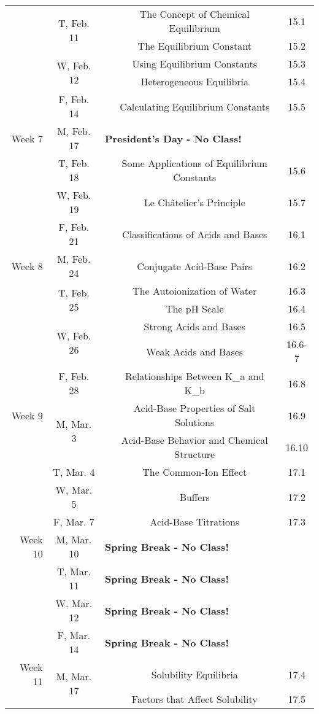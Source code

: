 \begin{tabular}{rcccc}
& \multirow{2}{*}{T, Feb. 11}& & The Concept of Chemical Equilibrium & 15.1\\
& & & The Equilibrium Constant & 15.2\\
& \multirow{2}{*}{W, Feb. 12}& & Using Equilibrium Constants & 15.3\\
& & & Heterogeneous Equilibria & 15.4\\
& F, Feb. 14&& Calculating Equilibrium Constants & 15.5\\
\midrule
Week 7 & M, Feb. 17& \multicolumn{3}{l}{\textbf{President's Day - No Class!}}\\
& T, Feb. 18&& Some Applications of Equilibrium Constants & 15.6\\
& W, Feb. 19&& Le Ch\^atelier's Principle & 15.7\\
& F, Feb. 21&& Classifications of Acids and Bases & 16.1\\
\midrule
Week 8 & M, Feb. 24&& Conjugate Acid-Base Pairs & 16.2\\
& \multirow{2}{*}{T, Feb. 25}& & The Autoionization of Water & 16.3\\
& & & The pH Scale & 16.4\\
& \multirow{2}{*}{W, Feb. 26}& & Strong Acids and Bases & 16.5\\
& & & Weak Acids and Bases & 16.6-7\\
& F, Feb. 28&& Relationships Between K_a and K_b & 16.8\\
\midrule
Week 9 & \multirow{2}{*}{M, Mar. 3}& & Acid-Base Properties of Salt Solutions & 16.9\\
& & & Acid-Base Behavior and Chemical Structure & 16.10\\
& T, Mar. 4&& The Common-Ion Effect & 17.1\\
& W, Mar. 5&& Buffers & 17.2\\
& F, Mar. 7&& Acid-Base Titrations & 17.3\\
\midrule
Week 10 & M, Mar. 10& \multicolumn{3}{l}{\textbf{Spring Break - No Class!}}\\
& T, Mar. 11& \multicolumn{3}{l}{\textbf{Spring Break - No Class!}}\\
& W, Mar. 12& \multicolumn{3}{l}{\textbf{Spring Break - No Class!}}\\
& F, Mar. 14& \multicolumn{3}{l}{\textbf{Spring Break - No Class!}}\\
\midrule
Week 11 & \multirow{2}{*}{M, Mar. 17}& & Solubility Equilibria & 17.4\\
& & & Factors that Affect Solubility & 17.5\\

\end{tabular}

